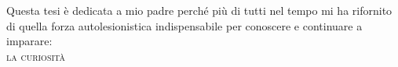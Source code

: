 \thispagestyle{empty}
\vspace*{2em}
\begin{center}
\large Questa tesi è dedicata a mio padre perché più di tutti nel tempo mi ha rifornito
di quella forza autolesionistica indispensabile per conoscere e continuare a imparare:\\
{\Large\vspace{0.5em} \textsc{la curiosità}}
\end{center}

